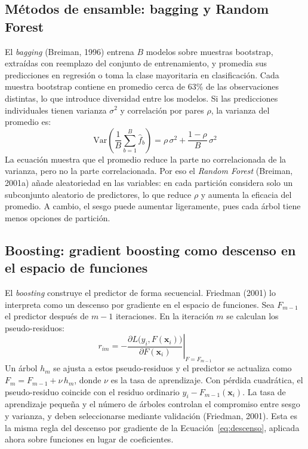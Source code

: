 \subsection{Métodos de ensamble: bagging y Random Forest}
El \textit{bagging} (Breiman, 1996) entrena $B$ modelos sobre muestras bootstrap, extraídas con reemplazo del conjunto de entrenamiento, y promedia sus predicciones en regresión o toma la clase mayoritaria en clasificación. Cada muestra bootstrap contiene en promedio cerca de 63\% de las observaciones distintas, lo que introduce diversidad entre los modelos. Si las predicciones individuales tienen varianza $\sigma^2$ y correlación por pares $\rho$, la varianza del promedio es:
\begin{equation}
\text{Var}\left(\frac{1}{B}\sum_{b=1}^B \hat{f}_b\right) = \rho\,\sigma^2 + \frac{1-\rho}{B}\,\sigma^2
\label{eq:varianza_ensamble}
\end{equation}
La ecuación muestra que el promedio reduce la parte no correlacionada de la varianza, pero no la parte correlacionada. Por eso el \textit{Random Forest} (Breiman, 2001a) añade aleatoriedad en las variables: en cada partición considera solo un subconjunto aleatorio de predictores, lo que reduce $\rho$ y aumenta la eficacia del promedio. A cambio, el sesgo puede aumentar ligeramente, pues cada árbol tiene menos opciones de partición.

\subsection{Boosting: gradient boosting como descenso en el espacio de funciones}\label{sec:boosting}
El \textit{boosting} construye el predictor de forma secuencial. Friedman (2001) lo interpreta como un descenso por gradiente en el espacio de funciones. Sea $F_{m-1}$ el predictor después de $m-1$ iteraciones. En la iteración $m$ se calculan los pseudo-residuos:
\begin{equation}
r_{im} = -\left.\frac{\partial L\big(y_i,F(\mathbf{x}_i)\big)}{\partial F(\mathbf{x}_i)}\right|_{F=F_{m-1}}
\label{eq:pseudo_residuos}
\end{equation}
Un árbol $h_m$ se ajusta a estos pseudo-residuos y el predictor se actualiza como $F_m = F_{m-1} + \nu\, h_m$, donde $\nu$ es la tasa de aprendizaje. Con pérdida cuadrática, el pseudo-residuo coincide con el residuo ordinario $y_i-F_{m-1}(\mathbf{x}_i)$. La tasa de aprendizaje pequeña y el número de árboles controlan el compromiso entre sesgo y varianza, y deben seleccionarse mediante validación (Friedman, 2001). Esta es la misma regla del descenso por gradiente de la Ecuación~\eqref{eq:descenso}, aplicada ahora sobre funciones en lugar de coeficientes.

